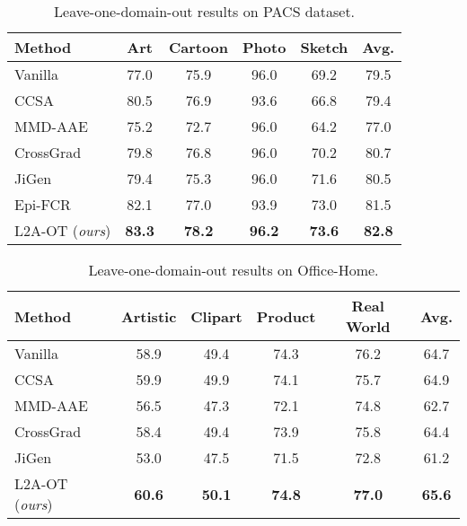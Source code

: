 \documentclass[runningheads]{llncs}
\begin{document}
\begin{table}[t]
\tabstyle{7pt}
\begin{tabular}{l | c c c c | c}
\hline
Method & Art & Cartoon & Photo & Sketch & Avg. \\ \hline
Vanilla & 77.0 & 75.9 & 96.0 & 69.2 & 79.5 \\
CCSA~\cite{motiian2017unified} & 80.5 & 76.9 & 93.6 & 66.8 & 79.4 \\
MMD-AAE~\cite{li2018mmdaae} & 75.2 & 72.7 & 96.0 & 64.2 & 77.0 \\
CrossGrad~\cite{shankar2018generalizing} & 79.8 & 76.8 & 96.0 & 70.2 & 80.7 \\
JiGen~\cite{cvpr19JiGen} & 79.4 & 75.3 & 96.0 & 71.6 & 80.5 \\
Epi-FCR~\cite{li2019episodic} & 82.1 & 77.0 & 93.9 & 73.0 & 81.5 \\
L2A-OT (\emph{ours}) & \textbf{83.3} & \textbf{78.2} & \textbf{96.2} & \textbf{73.6} & \textbf{82.8} \\
\hline
\end{tabular}
\caption{Leave-one-domain-out results on PACS dataset.}
\label{tab:resOnPACS}
\end{table}

\begin{table}[t]
\tabstyle{5pt}
\begin{tabular}{l | c c c c | c}
\hline
Method & Artistic & Clipart & Product & Real World & Avg. \\ \hline
Vanilla & 58.9 & 49.4 & {74.3} & {76.2} & 64.7 \\
CCSA~\cite{motiian2017unified} & {59.9} & {49.9} & 74.1 & 75.7 & {64.9} \\
MMD-AAE~\cite{li2018mmdaae} & 56.5 & 47.3 & 72.1 & 74.8 & 62.7 \\
CrossGrad~\cite{shankar2018generalizing} & 58.4 & 49.4 & 73.9 & 75.8 & 64.4 \\
JiGen~\cite{cvpr19JiGen} & 53.0 & 47.5 & 71.5 & 72.8 & 61.2 \\
L2A-OT  (\emph{ours}) & \textbf{60.6} & \textbf{50.1} & \textbf{74.8} & \textbf{77.0} & \textbf{65.6} \\
\hline
\end{tabular}
\caption{Leave-one-domain-out results on Office-Home.}
\label{tab:resOnOfficeHome}
\end{table}
\end{document}
